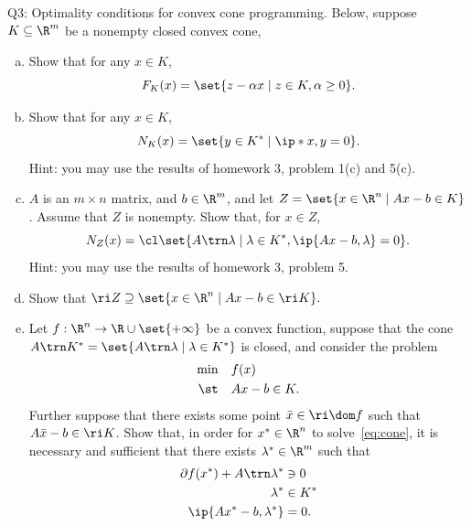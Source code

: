 \documentclass{article}
\theoremstyle{plain}
\theoremstyle{definition}
\theoremstyle{remark}
\begin{document}
\begin{problem}
    {Q3: Optimality conditions for convex cone programming.}
    Below, suppose $K\subseteq\R^m$ be a nonempty closed convex cone,
    \begin{enumerate}[(a)]
        \item Show that for any $x\in K$, \[F_K(x)=\set{z-\alpha x\mid z\in K, \alpha\geq 0}.\]
        \item Show that for any $x\in K$, \[N_K(x)=\set{y\in K^*\mid \ip*{x,y}=0}.\]
        Hint: you may use the results of homework 3, problem 1(c) and 5(c).
        \item  $A$ is an $m\times n$ matrix, and $b\in\R^m$, and let $Z=\set{x\in\R^n\mid Ax-b\in K}$. Assume that $Z$ is nonempty. Show that, for $x\in Z$, \[N_Z(x)=\cl\set{A\trn\lambda\mid\lambda\in K^*,\ip{Ax-b,\lambda}=0}.\]
        Hint: you may use the results of homework 3, problem 5.
        \item Show that $\ri Z \supseteq\set{x\in\R^n\mid Ax-b\in\ri K}.$
        \item Let $f:\R^n\rightarrow\R\cup\set{+\infty}$ be a convex function, suppose that the cone $A\trn K^*=\set{A\trn\lambda\mid\lambda\in K^*}$ is closed, and consider the problem{
            \begin{equation}
                \begin{aligned}
                    \min & \quad f(x) \\
                    \st & \quad Ax-b\in K.
                \end{aligned}
                \label{eq:cone}
            \end{equation}
        }
        Further suppose that there exists some point $\bar{x}\in\ri\dom f$ such that $A\bar{x}-b\in\ri K$. Show that, in order for $x^*\in\R^n$ to solve~\cref{eq:cone}, it is necessary and sufficient that there exists $\lambda^*\in \R^m$ such that
        \begin{align*}
            \partial f(x^*)+A\trn\lambda^* &\ni 0 \\
            \lambda^* & \in K^* \\
            \ip{Ax^*-b,\lambda^*} & =0.
        \end{align*}
    \end{enumerate}
\end{problem}
\end{document}
